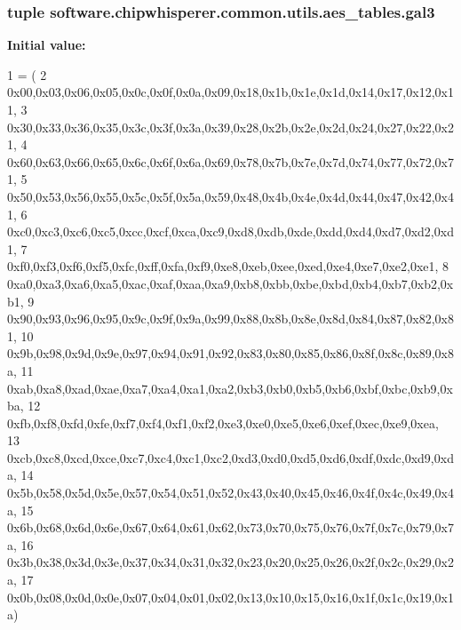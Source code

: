 \subsubsection[{gal3}]{\setlength{\rightskip}{0pt plus 5cm}tuple software.\+chipwhisperer.\+common.\+utils.\+aes\+\_\+tables.\+gal3}\label{namespacesoftware_1_1chipwhisperer_1_1common_1_1utils_1_1aes__tables_afccddd28f57f23c2289277deb3dc8f61}
{\bfseries Initial value\+:}
\begin{DoxyCode}
1 = (
2 0x00,0x03,0x06,0x05,0x0c,0x0f,0x0a,0x09,0x18,0x1b,0x1e,0x1d,0x14,0x17,0x12,0x11,
3 0x30,0x33,0x36,0x35,0x3c,0x3f,0x3a,0x39,0x28,0x2b,0x2e,0x2d,0x24,0x27,0x22,0x21,
4 0x60,0x63,0x66,0x65,0x6c,0x6f,0x6a,0x69,0x78,0x7b,0x7e,0x7d,0x74,0x77,0x72,0x71,
5 0x50,0x53,0x56,0x55,0x5c,0x5f,0x5a,0x59,0x48,0x4b,0x4e,0x4d,0x44,0x47,0x42,0x41,
6 0xc0,0xc3,0xc6,0xc5,0xcc,0xcf,0xca,0xc9,0xd8,0xdb,0xde,0xdd,0xd4,0xd7,0xd2,0xd1,
7 0xf0,0xf3,0xf6,0xf5,0xfc,0xff,0xfa,0xf9,0xe8,0xeb,0xee,0xed,0xe4,0xe7,0xe2,0xe1,
8 0xa0,0xa3,0xa6,0xa5,0xac,0xaf,0xaa,0xa9,0xb8,0xbb,0xbe,0xbd,0xb4,0xb7,0xb2,0xb1,
9 0x90,0x93,0x96,0x95,0x9c,0x9f,0x9a,0x99,0x88,0x8b,0x8e,0x8d,0x84,0x87,0x82,0x81,
10 0x9b,0x98,0x9d,0x9e,0x97,0x94,0x91,0x92,0x83,0x80,0x85,0x86,0x8f,0x8c,0x89,0x8a,
11 0xab,0xa8,0xad,0xae,0xa7,0xa4,0xa1,0xa2,0xb3,0xb0,0xb5,0xb6,0xbf,0xbc,0xb9,0xba,
12 0xfb,0xf8,0xfd,0xfe,0xf7,0xf4,0xf1,0xf2,0xe3,0xe0,0xe5,0xe6,0xef,0xec,0xe9,0xea,
13 0xcb,0xc8,0xcd,0xce,0xc7,0xc4,0xc1,0xc2,0xd3,0xd0,0xd5,0xd6,0xdf,0xdc,0xd9,0xda,
14 0x5b,0x58,0x5d,0x5e,0x57,0x54,0x51,0x52,0x43,0x40,0x45,0x46,0x4f,0x4c,0x49,0x4a,
15 0x6b,0x68,0x6d,0x6e,0x67,0x64,0x61,0x62,0x73,0x70,0x75,0x76,0x7f,0x7c,0x79,0x7a,
16 0x3b,0x38,0x3d,0x3e,0x37,0x34,0x31,0x32,0x23,0x20,0x25,0x26,0x2f,0x2c,0x29,0x2a,
17 0x0b,0x08,0x0d,0x0e,0x07,0x04,0x01,0x02,0x13,0x10,0x15,0x16,0x1f,0x1c,0x19,0x1a)
\end{DoxyCode}
\hypertarget{namespacesoftware_1_1chipwhisperer_1_1common_1_1utils_1_1aes__tables_acd6562231fb0f517aa9ccf026745606a}{}
